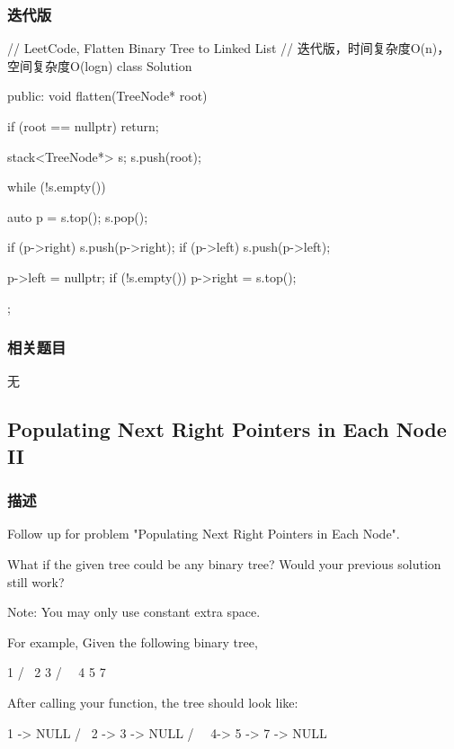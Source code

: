 \subsubsection{迭代版}
\begin{Code}
// LeetCode, Flatten Binary Tree to Linked List
// 迭代版，时间复杂度O(n)，空间复杂度O(logn)
class Solution {
public:
    void flatten(TreeNode* root) {
        if (root == nullptr) return;

        stack<TreeNode*> s;
        s.push(root);

        while (!s.empty()) {
            auto p = s.top();
            s.pop();

            if (p->right)
                s.push(p->right);
            if (p->left)
                s.push(p->left);

            p->left = nullptr;
            if (!s.empty())
                p->right = s.top();
        }
    }
};
\end{Code}


\subsubsection{相关题目}
\begindot
\item 无
\myenddot


\subsection{Populating Next Right Pointers in Each Node II} %
\label{sec:populating-next-right-pointers-in-each-node-ii}


\subsubsection{描述}
Follow up for problem "Populating Next Right Pointers in Each Node".

What if the given tree could be any binary tree? Would your previous solution still work?

Note: You may only use constant extra space.

For example,
Given the following binary tree,
\begin{Code}
         1
       /  \
      2    3
     / \    \
    4   5    7
\end{Code}

After calling your function, the tree should look like:
\begin{Code}
         1 -> NULL
       /  \
      2 -> 3 -> NULL
     / \    \
    4-> 5 -> 7 -> NULL
\end{Code}



